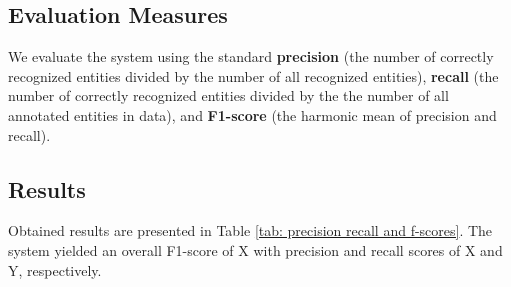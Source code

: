 \documentclass[11pt]{article}
\begin{document}
\subsection{Evaluation Measures}
\label{sec: evaluation}

We evaluate the system using the standard \textbf{precision} (the number of correctly recognized entities divided by the number of all recognized entities), \textbf{recall} (the number of correctly recognized entities divided by the the number of all annotated entities in data), and \textbf{F1-score} (the harmonic mean of precision and recall). %






\subsection{Results}
\label{sec: results}

Obtained results are presented in Table \ref{tab: precision recall and f-scores}. The system yielded an overall F1-score of X with precision and recall scores of  X and Y, respectively.
\end{document}
